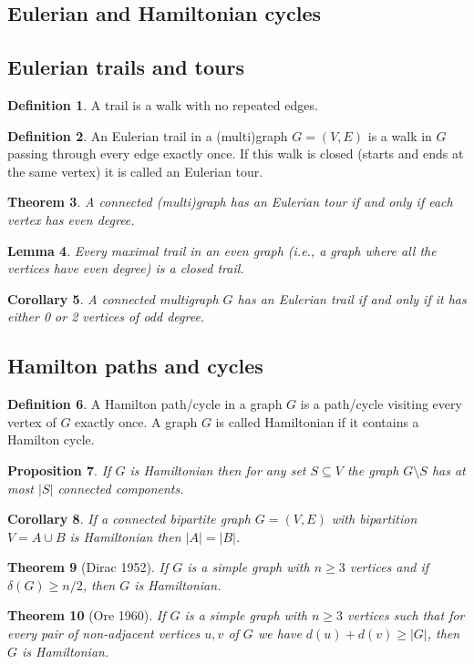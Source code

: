 \documentclass[11pt, fleqn, a4paper, landscape]{article}
\theoremstyle{plain} %
\newtheorem{thm}{Theorem}
\newtheorem{lem}[thm]{Lemma}
\newtheorem{pro}[thm]{Proposition}
\newtheorem{cor}[thm]{Corollary}
\theoremstyle{remark} %
\theoremstyle{definition} %
\newtheorem{defi}[thm]{Definition}
\begin{document}
\begin{multicols}{3}
\section{Eulerian and Hamiltonian cycles}
\subsection{Eulerian trails and tours}
\addtocounter{thm}{1}
\begin{defi}
A trail is a walk with no repeated edges.
\end{defi}

\begin{defi}
An Eulerian trail in a (multi)graph $G = (V,E)$ is a walk in $G$ passing through every edge exactly once. If this walk is closed (starts and ends at the same vertex) it is called an Eulerian tour.
\end{defi}
\addtocounter{thm}{1}
\begin{thm}
A connected (multi)graph has an Eulerian tour if and only if each vertex has even degree.
\end{thm}

\begin{lem}
Every maximal trail in an even graph (i.e., a graph where all the vertices have even degree) is a closed trail.
\end{lem} 

\begin{cor}
A connected multigraph $G$ has an Eulerian trail if and only if it has either 0 or 2 vertices of odd degree.
\end{cor}

\subsection{Hamilton paths and cycles}
\begin{defi}
A Hamilton path/cycle in a graph $G$ is a path/cycle visiting every vertex of $G$ exactly once. A graph $G$ is called Hamiltonian if it contains a Hamilton cycle.
\end{defi}
\addtocounter{thm}{1}
\begin{pro}
If $G$ is Hamiltonian then for any set $S \subseteq V$ the graph $G\setminus S$ has at most $|S|$ connected components.
\end{pro}

\begin{cor}
If a connected bipartite graph $G = (V,E)$ with bipartition $V = A\cup B$ is Hamiltonian then $|A|=|B|$.
\end{cor}
\addtocounter{thm}{1}
\begin{thm}[Dirac 1952]
If $G$ is a simple graph with $n \ge 3$ vertices and if $\delta(G) \ge n/2$, then $G$ is Hamiltonian.
\end{thm}
\addtocounter{thm}{1}
\begin{thm}[Ore 1960]
If $G$ is a simple graph with $n\ge 3$ vertices such that for every pair of
non-adjacent vertices $u, v$ of $G$ we have $d(u) + d(v)\ge |G|$, then $G $ is Hamiltonian.
\end{thm}

\end{multicols}
\end{document}
